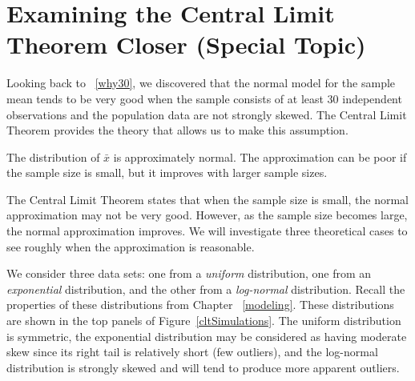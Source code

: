 \section{Examining the Central Limit Theorem Closer (Special Topic)}
\label{cltSection}


Looking back to ~\ref{why30}, we discovered that the normal model for the sample mean tends to be very good when the sample consists of at least 30 independent observations and the population data are not strongly skewed. The Central Limit Theorem provides the theory that allows us to make this assumption.

\begin{termBox}{
The distribution of $\bar{x}$ is approximately normal. The approximation can be poor if the sample size is small, but it improves with larger sample sizes.}
\end{termBox}

The Central Limit Theorem states that when the sample size is small, the normal approximation may not be very good. However, as the sample size becomes large, the normal approximation improves. We will investigate three theoretical cases to see roughly when the approximation is reasonable.

We consider three data sets: one from a \emph{uniform} distribution, one from an \emph{exponential} distribution, and the other from a \emph{log-normal} distribution. Recall the properties of these distributions from Chapter ~\ref{modeling}. These distributions are shown in the top panels of Figure~\ref{cltSimulations}. The uniform distribution is symmetric, the exponential distribution may be considered as having moderate skew since its right tail is relatively short (few outliers), and the log-normal distribution is strongly skewed and will tend to produce more apparent outliers.

